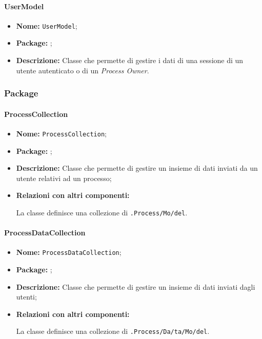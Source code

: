 \paragraph{UserModel}
\begin{flushleft}
\begin{itemize}
\item \textbf{Nome:} \texttt{UserModel};
\item \textbf{Package:} \texttt{\model{}};
\item \textbf{Descrizione:} Classe che permette di gestire i dati di una sessione di un utente autenticato o di un \textit{Process Owner}.
\end{itemize}
\end{flushleft}

\subsubsection{Package \collection{}}

\paragraph{ProcessCollection}
\begin{flushleft}
\begin{itemize}
\item \textbf{Nome:} \texttt{ProcessCollection};
\item \textbf{Package:} \texttt{\collection{}};
\item \textbf{Descrizione:} Classe che permette di gestire un insieme di dati inviati da un utente relativi ad un processo;
\item \textbf{Relazioni con altri componenti:}
\begin{sloppypar}
La classe definisce una collezione di \texttt{\model{}.Process\fshyp{}Mo\fshyp{}del}.
\end{sloppypar}
\end{itemize}
\end{flushleft}

\paragraph{ProcessDataCollection}
\begin{flushleft}
\begin{itemize}
\item \textbf{Nome:} \texttt{ProcessDataCollection};
\item \textbf{Package:} \texttt{\collection{}};
\item \textbf{Descrizione:} Classe che permette di gestire un insieme di dati inviati dagli utenti;
\item \textbf{Relazioni con altri componenti:}
\begin{sloppypar}
La classe definisce una collezione di \texttt{\model{}.Process\fshyp{}Da\fshyp{}ta\fshyp{}Mo\fshyp{}del}.
\end{sloppypar}
\end{itemize}
\end{flushleft}


